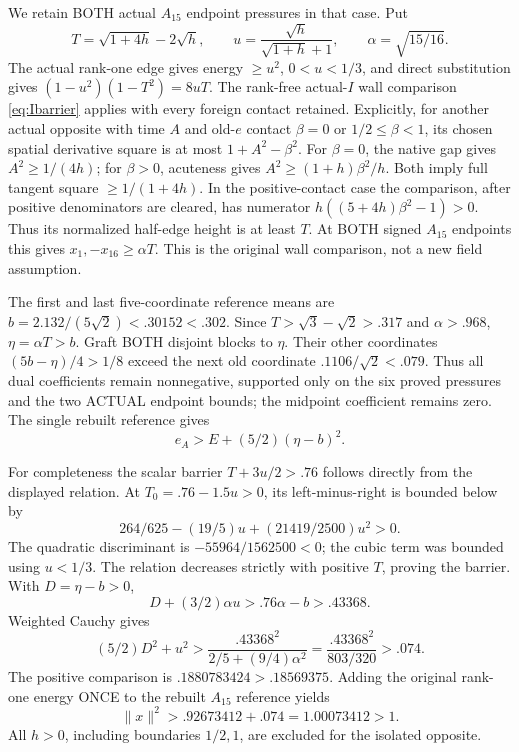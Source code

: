 \documentclass[11pt]{article}
\begin{document}
We retain BOTH actual \(A_{15}\) endpoint pressures in that case.
Put
\[
 T=\sqrt{1+4h}-2\sqrt h,\qquad
 u={\frac{\sqrt h}{\sqrt{1+h}+1}},\qquad
 \alpha=\sqrt{15/16}.
\]
The actual rank-one edge gives energy \(\ge u^2\), \(0<u<1/3\),
and direct substitution gives
\((1-u^2)(1-T^2)=8uT\).
The rank-free actual-\(I\) wall comparison
\eqref{eq:Ibarrier} applies with every foreign contact retained.
Explicitly, for another actual opposite with time \(A\)
and old-\(e\) contact \(\beta=0\) or \(1/2\le\beta<1\),
its chosen spatial derivative square is at most
\(1+A^2-\beta^2\).
For \(\beta=0\), the native gap gives \(A^2\ge1/(4h)\);
for \(\beta>0\), acuteness gives
\(A^2\ge(1+h)\beta^2/h\).
Both imply full tangent square \(\ge1/(1+4h)\).
In the positive-contact case the comparison, after positive
denominators are cleared, has numerator
\(h((5+4h)\beta^2-1)>0\).
Thus its normalized half-edge height is at least \(T\).
At BOTH signed \(A_{15}\) endpoints this gives
\(x_1,-x_{16}\ge\alpha T\).
This is the original wall comparison, not a new field assumption.

The first and last five-coordinate reference means are
\(b=2.132/(5\sqrt2)<.30152<.302\).
Since \(T>\sqrt3-\sqrt2>.317\) and \(\alpha>.968\),
\(\eta=\alpha T>b\).
Graft BOTH disjoint blocks to \(\eta\).
Their other coordinates
\((5b-\eta)/4>1/8\) exceed the next old coordinate
\(.1106/\sqrt2<.079\).
Thus all dual coefficients remain nonnegative, supported only
on the six proved pressures and the two ACTUAL endpoint bounds;
the midpoint coefficient remains zero.
The single rebuilt reference gives
\[
                         e_A>E+(5/2)(\eta-b)^2 .
\]

For completeness the scalar barrier \(T+3u/2>.76\) follows
directly from the displayed relation.
At \(T_0=.76-1.5u>0\), its left-minus-right is bounded below by
\[
                  264/625-(19/5)u+(21419/2500)u^2>0 .
\]
The quadratic discriminant is \(-55964/1562500<0\);
the cubic term was bounded using \(u<1/3\).
The relation decreases strictly with positive \(T\), proving
the barrier.
With \(D=\eta-b>0\),
\[
 D+(3/2)\alpha u>.76\alpha-b>.43368.
\]
Weighted Cauchy gives
\[
 (5/2)D^2+u^2>
 {\frac{.43368^2}{2/5+(9/4)\alpha^2}}
 ={\frac{.43368^2}{803/320}}>.074 .
\]
The positive comparison is
\(.1880783424>.18569375\).
Adding the original rank-one energy ONCE to the rebuilt
\(A_{15}\) reference yields
\[
                     \|x\|^2>.92673412+.074=1.00073412>1 .
\]
All \(h>0\), including boundaries \(1/2,1\), are excluded
for the isolated opposite.
\end{document}
